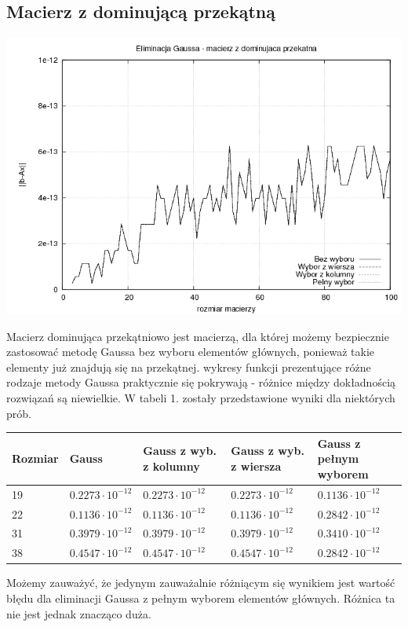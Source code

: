 \documentclass[a4paper,10pt]{article}
\begin{document}
    \subsection{Macierz z dominującą przekątną}
        \begin{center}
            \includegraphics[width=140mm]{dominating_plot.png}
        \end{center}
        Macierz dominująca przekątniowo jest macierzą, dla której możemy bezpiecznie zastosować metodę Gaussa bez wyboru elementów głównych, ponieważ takie elementy już znajdują się na przekątnej. wykresy funkcji prezentujące różne rodzaje metody Gaussa praktycznie się pokrywają - różnice między dokładnością rozwiązań są niewielkie. W tabeli 1. zostały przedstawione wyniki dla niektórych prób.
        \begin{center}
            \begin{tabular}{ | l | l | l | l | l | }
            \hline
            Rozmiar & Gauss & Gauss z wyb. z kolumny & Gauss z wyb. z wiersza & Gauss z pełnym wyborem \\ \hline
            19 & $0.2273 \cdot 10^{-12}$ & $0.2273 \cdot 10^{-12}$ & $0.2273 \cdot 10^{-12}$ & $0.1136 \cdot 10^{-12}$ \\ \hline
            22 & $0.1136 \cdot 10^{-12}$ & $0.1136 \cdot 10^{-12}$ & $0.1136 \cdot 10^{-12}$ & $0.2842 \cdot 10^{-12}$ \\ \hline
            31 & $0.3979 \cdot 10^{-12}$ & $0.3979 \cdot 10^{-12}$ & $0.3979 \cdot 10^{-12}$ & $0.3410 \cdot 10^{-12}$ \\ \hline
            38 & $0.4547 \cdot 10^{-12}$ & $0.4547 \cdot 10^{-12}$ & $0.4547 \cdot 10^{-12}$ & $0.2842 \cdot 10^{-12}$ \\ \hline
            \end{tabular}
        \end{center}
        Możemy zauważyć, że jedynym zauważalnie różniącym się wynikiem jest wartość błędu dla eliminacji Gaussa z pełnym wyborem elementów głównych. Różnica ta nie jest jednak znacząco duża.
\end{document}
